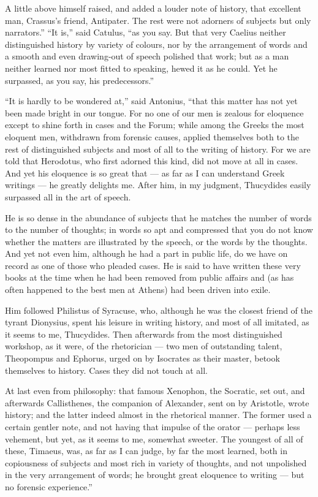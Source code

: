  A little above himself raised, and added a louder note of history, that excellent man, Crassus's friend, Antipater. The rest were not adorners of subjects but only narrators.'' ``It is,'' said Catulus, ``as you say. But that very Caelius neither distinguished history by variety of colours, nor by the arrangement of words and a smooth and even drawing-out of speech polished that work; but as a man neither learned nor most fitted to speaking, hewed it as he could. Yet he surpassed, as you say, his predecessors.''

 ``It is hardly to be wondered at,'' said Antonius, ``that this matter has not yet been made bright in our tongue. For no one of our men is zealous for eloquence except to shine forth in cases and the Forum; while among the Greeks the most eloquent men, withdrawn from forensic causes, applied themselves both to the rest of distinguished subjects and most of all to the writing of history. For we are told that Herodotus, who first adorned this kind, did not move at all in cases. And yet his eloquence is so great that — as far as I can understand Greek writings — he greatly delights me. After him, in my judgment, Thucydides easily surpassed all in the art of speech.

 He is so dense in the abundance of subjects that he matches the number of words to the number of thoughts; in words so apt and compressed that you do not know whether the matters are illustrated by the speech, or the words by the thoughts. And yet not even him, although he had a part in public life, do we have on record as one of those who pleaded cases. He is said to have written these very books at the time when he had been removed from public affairs and (as has often happened to the best men at Athens) had been driven into exile.

 Him followed Philistus of Syracuse, who, although he was the closest friend of the tyrant Dionysius, spent his leisure in writing history, and most of all imitated, as it seems to me, Thucydides. Then afterwards from the most distinguished workshop, as it were, of the rhetorician — two men of outstanding talent, Theopompus and Ephorus, urged on by Isocrates as their master, betook themselves to history. Cases they did not touch at all.

 At last even from philosophy: that famous Xenophon, the Socratic, set out, and afterwards Callisthenes, the companion of Alexander, sent on by Aristotle, wrote history; and the latter indeed almost in the rhetorical manner. The former used a certain gentler note, and not having that impulse of the orator — perhaps less vehement, but yet, as it seems to me, somewhat sweeter. The youngest of all of these, Timaeus, was, as far as I can judge, by far the most learned, both in copiousness of subjects and most rich in variety of thoughts, and not unpolished in the very arrangement of words; he brought great eloquence to writing — but no forensic experience.''

